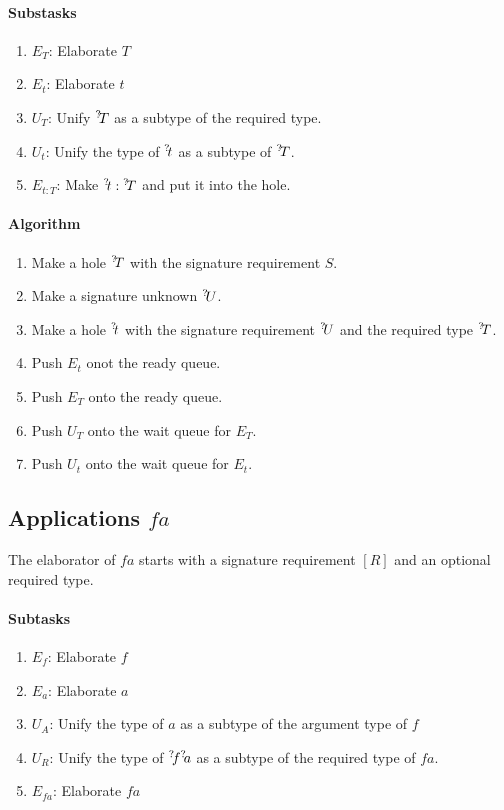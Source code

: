 \paragraph{Substasks}
\begin{enumerate}
    \item $E_T$: Elaborate $T$
    \item $E_t$: Elaborate $t$
    \item $U_T$: Unify ${{}^? \kern-0.2em T}$ as a subtype of the required type.
    \item $U_t$: Unify the type of ${{}^? \kern-0.2em t}$ as a subtype of ${{}^? \kern-0.2em T}$.
    \item $E_{t:T}$: Make ${{}^? \kern-0.2em t}: {{}^? \kern-0.2em T}$ and put it into the hole.
\end{enumerate}

\paragraph{Algorithm}
\begin{enumerate}
    \item Make a hole ${{}^? \kern-0.2em T}$ with the signature requirement $S$.
    \item Make a signature unknown ${{}^? \kern-0.2em U}$.
    \item Make a hole ${{}^? \kern-0.2em t}$ with the signature requirement ${{}^? \kern-0.2em U}$ and the
        required type ${{}^? \kern-0.2em T}$.

    \item Push $E_t$ onot the ready queue.
    \item Push $E_T$ onto the ready queue.
    \item Push $U_T$ onto the wait queue for $E_T$.
    \item Push $U_t$ onto the wait queue for $E_t$.
\end{enumerate}








\subsection{Applications $f a$}



The elaborator of $f a$ starts with a signature requirement $[R]$ and
an optional required type.

\paragraph{Subtasks}
\begin{enumerate}
    \item $E_f$: Elaborate $f$
    \item $E_a$: Elaborate $a$
    \item $U_{A}$: Unify the type of $a$ as a subtype of the argument type of
        $f$
    \item $U_{R}$: Unify the type of ${{}^? \kern-0.2em f} {{}^? \kern-0.2em a}$ as a subtype of the
        required type of $fa$.
    \item $E_{fa}$: Elaborate $fa$
\end{enumerate}


